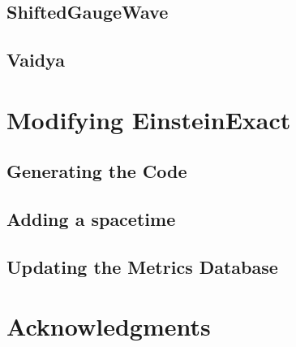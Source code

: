 \documentclass{article}
\begin{document}
\subsection{ShiftedGaugeWave}

\subsection{Vaidya}

\section{Modifying EinsteinExact}

\subsection{Generating the Code}

\subsection{Adding a spacetime}

\subsection{Updating the Metrics Database}

\section{Acknowledgments}


\end{document}
